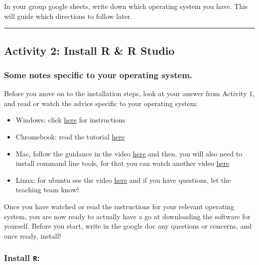 \documentclass[
]{book}
\providecommand{\tightlist}{%
  \setlength{\itemsep}{0pt}\setlength{\parskip}{0pt}}
\begin{document}
In your group google sheets, write down which operating system you have. This will guide which directions to follow later.

\begin{center}\rule{0.5\linewidth}{0.5pt}\end{center}

\hypertarget{activity-2-install-r-r-studio}{%
\subsection{Activity 2: Install R \& R Studio}\label{activity-2-install-r-r-studio}}

\hypertarget{some-notes-specific-to-your-operating-system.}{%
\subsubsection{Some notes specific to your operating system.}\label{some-notes-specific-to-your-operating-system.}}

Before you move on to the installation steps, look at your answer from Activity 1, and read or watch the advice specific to your operating system:

\begin{itemize}
\tightlist
\item
  Windows: click \href{https://www.youtube.com/watch?v=VLWaED9jTiA}{here} for instructions
\item
  Chromebook: read the tutorial \href{https://blog.sellorm.com/2018/12/20/installing-r-and-rstudio-on-a-chromebook/}{here}
\item
  Mac, follow the guidance in the video \href{https://www.youtube.com/watch?v=cX532N_XLIs\&list=PLqzoL9-eJTNDw71zWePXyHx3_cm_fMP8S}{here} and then, you will also need to install command line tools, for that you can watch another video \href{https://www.youtube.com/watch?v=3Yd9J_dhSfY}{here}
\item
  Linux: for ubuntu see the video \href{https://www.youtube.com/watch?v=kF0-FH-xBiE}{here} and if you have questions, let the teaching team know!
\end{itemize}

Once you have watched or read the instructions for your relevant operating system, you are now ready to actually have a go at downloading the software for yourself. Before you start, write in the google doc any questions or concerns, and once ready, install!

\hypertarget{install-r}{%
\subsubsection*{\texorpdfstring{Install \texttt{R}:}{Install R:}}\label{install-r}}
\end{document}
